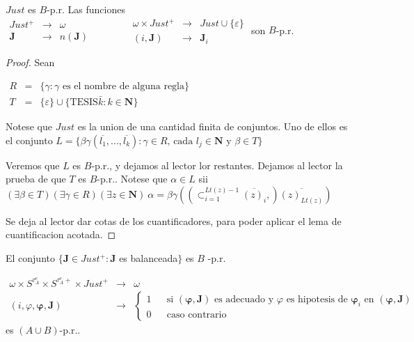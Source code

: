   \begin{lemma}
    \(Just\) es \(B\)-p.r. Las funciones
    \(\displaystyle \begin{array}{ccc} Just^{+} & \rightarrow & \omega \\ \mathbf{J} & \rightarrow & n(\mathbf{J}) \end{array} \ \ \ \ \ \ \ \ \ \ \ \ \ \ \ \ \ \begin{array}{ccc} \omega \times Just^{+} & \rightarrow & Just\cup \{\varepsilon \} \\ (i,\mathbf{J}) & \rightarrow & \mathbf{J}_{i} \end{array} \)
    son \(B\)-p.r.
  \end{lemma}
  \begin{proof}
    Sean

    \(\displaystyle \begin{array}{rcl} R & =& \{\gamma :\gamma \text{ es el nombre de alguna regla}\} \\ T & =& \{\varepsilon \}\cup \{\text{TESIS}\bar{k}:k\in \mathbf{N}\} \end{array} \)

    Notese que \(Just\) es la union de una cantidad finita de conjuntos. Uno de ellos es el conjunto
    \(\displaystyle L=\{\beta \gamma (\overline{l_{1}},...,\overline{l_{k}}):\gamma \in R\text{, cada }l_{j}\in \mathbf{N}\text{ y }\beta \in T\} \)

    Veremos que \(L\) es \(B\)-p.r., y dejamos al lector lor restantes. Dejamos al lector la prueba de que \(T\) es \(B\)-p.r.. Notese que \(\alpha \in L\) sii
    \(\displaystyle (\exists \beta \in T)(\exists \gamma \in R)(\exists z\in \mathbf{N})\ \alpha =\beta \gamma (\left( \subset _{i=1}^{Lt(z)-1}\overline{(z)_{i}},\right) \overline{(z)_{Lt(z)}}) \)

    Se deja al lector dar cotas de los cuantificadores, para poder aplicar el lema de cuantificacion acotada.
  \end{proof}

  \begin{lemma}
    El conjunto \(\{\mathbf{J}\in Just^{+}:\mathbf{J}\) es balanceada\(\}\) es \(B\) -p.r.
  \end{lemma}

  \begin{lemma}
    \(\displaystyle \begin{array}{rcl} \omega \times S^{\tau _{A}^{e}}\times S^{\tau _{A}^{e}+}\times Just^{+} & \rightarrow & \omega \\ (i,\varphi ,\mathbf{\varphi },\mathbf{J}) & \rightarrow & \left\{ \begin{array}{ccl} 1 & & \text{si }(\mathbf{\varphi },\mathbf{J})\text{ es adecuado y }\varphi \text{ es hipotesis de }\mathbf{\varphi }_{i}\text{ en }(\mathbf{\varphi }, \mathbf{J}) \\ 0 & & \text{caso contrario} \end{array} \right. \end{array} \)
    es \((A\cup B)\)-p.r..
  \end{lemma}

